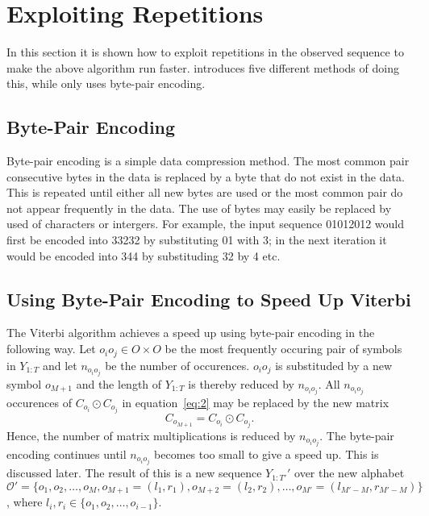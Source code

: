 \section{Exploiting Repetitions}
\label{sec:expl-repet}

In this section it is shown how to exploit repetitions in the observed sequence
to make the above algorithm run faster. \citet{lifshits2009speeding} introduces
five different methods of doing this, while \citet{sand2013ziphmmlib} only uses
byte-pair encoding.

\subsection{Byte-Pair Encoding}

Byte-pair encoding is a simple data compression method. The most common pair
consecutive bytes in the data is replaced by a byte that do not exist in the
data. This is repeated until either all new bytes are used or the most common
pair do not appear frequently in the data. The use of bytes may easily be
replaced by used of characters or intergers. For example, the input sequence
01012012 would first be encoded into 33232 by substituting 01 with 3; in the
next iteration it would be encoded into 344 by substituding 32 by 4 etc.

\subsection{Using Byte-Pair Encoding to Speed Up Viterbi}
\label{sec:using-byte-pair}

The Viterbi algorithm achieves a speed up using byte-pair encoding in the
following way. Let $o_i o_j \in O \times O$ be the most frequently occuring
pair of symbols in $Y_{1:T}$ and let $n_{o_i o_j}$ be the number of
occurences. $o_i o_j$ is substituded by a new symbol $o_{M + 1}$ and the length
of $Y_{1:T}$ is thereby reduced by $n_{o_i o_j}$. All $n_{o_i o_j}$ occurences
of $C_{o_i} \odot C_{o_j}$ in equation~\eqref{eq:2} may be replaced by the new
matrix
\begin{equation}
  \label{eq:7}
  C_{o_{M + 1}} = C_{o_i} \odot C_{o_j}.
\end{equation}
Hence, the number of matrix multiplications is reduced by $n_{o_i o_j}$. The
byte-pair encoding continues until $n_{o_i o_j}$ becomes too small to give a
speed up. This is discussed later. The result of this is a new sequence
$Y_{1:T'}'$ over the new alphabet
$\mathcal{O}' = \{o_1, o_2, \dots, o_M, o_{M + 1} = (l_1, r_1), o_{M + 2} =
(l_2, r_2), \dots, o_{M'} = (l_{M' - M}, r_{M' - M}) \}$,
where $l_i, r_i \in \{ o_1, o_2, \dots, o_{i - 1} \}$.

